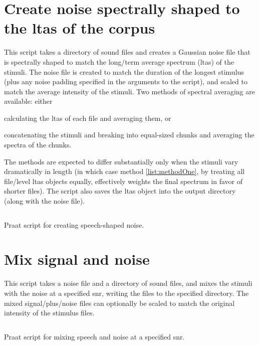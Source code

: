 \section[Create speech-shaped noise]{Create noise spectrally shaped to the \ac{ltas} of the corpus}
This script takes a directory of sound files and creates a Gaussian noise file that is spectrally shaped to match the long\-/term average spectrum (\ac{ltas}) of the stimuli.  The noise file is created to match the duration of the longest stimulus (plus any noise padding specified in the arguments to the script), and scaled to match the average intensity of the stimuli.  Two methods of spectral averaging are available: either
\begin{inparaenum}[(a)]
\item calculating the \ac{ltas} of each file and averaging them, or \label{list:methodOne} 
\item concatenating the stimuli and breaking into equal-sized chunks and averaging the spectra of the chunks.  
\end{inparaenum}
The methods are expected to differ substantially only when the stimuli vary dramatically in length (in which case method \ref{list:methodOne}, by treating all file\-/level \ac{ltas} objects equally, effectively weights the final spectrum in favor of shorter files).  The script also saves the \ac{ltas} object into the output directory (along with the noise file).
 \begin{code}
	\inputminted[fontsize=\footnotesize, tabsize=2]{r}{../scripts/dissversions/LTASNoise_DissVersion.praat}
	\caption[Create speech-shaped noise]{Praat script for creating speech-shaped noise.\label{lst:LTASNoise}}
\end{code}
\newpage

\section{Mix signal and noise}
This script takes a noise file and a directory of sound files, and mixes the stimuli with the noise at a specified \ac{snr}, writing the files to the specified directory.  The mixed signal\-/plus\-/noise files can optionally be scaled to match the original intensity of the stimulus files. 
\begin{code}
	\inputminted[fontsize=\footnotesize, tabsize=2]{r}{../scripts/dissversions/MixSpeechNoise_DissVersion.praat}
	\caption[Mix signal and noise]{Praat script for mixing speech and noise at a specified \ac{snr}.\label{lst:MixNoise}}
\end{code}
\newpage

